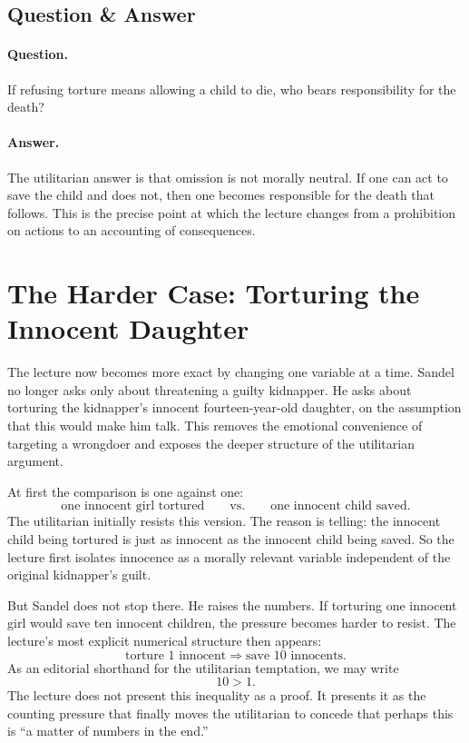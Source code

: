 \subsection{Question \& Answer}

\paragraph{Question.} If refusing torture means allowing a child to die, who bears responsibility for the death?

\paragraph{Answer.} The utilitarian answer is that omission is not morally neutral. If one can act to save the child and does not, then one becomes responsible for the death that follows. This is the precise point at which the lecture changes from a prohibition on actions to an accounting of consequences.

\section{The Harder Case: Torturing the Innocent Daughter}

The lecture now becomes more exact by changing one variable at a time. Sandel no longer asks only about threatening a guilty kidnapper. He asks about torturing the kidnapper's innocent fourteen-year-old daughter, on the assumption that this would make him talk. This removes the emotional convenience of targeting a wrongdoer and exposes the deeper structure of the utilitarian argument.

At first the comparison is one against one:
\begin{equation}
\text{one innocent girl tortured}
\qquad \text{vs.} \qquad
\text{one innocent child saved}.
\end{equation}
The utilitarian initially resists this version. The reason is telling: the innocent child being tortured is just as innocent as the innocent child being saved. So the lecture first isolates innocence as a morally relevant variable independent of the original kidnapper's guilt.

But Sandel does not stop there. He raises the numbers. If torturing one innocent girl would save ten innocent children, the pressure becomes harder to resist. The lecture's most explicit numerical structure then appears:
\begin{equation}
\text{torture }1\text{ innocent}
\Longrightarrow
\text{save }10\text{ innocents}.
\end{equation}
As an editorial shorthand for the utilitarian temptation, we may write
\begin{equation}
10 > 1.
\end{equation}
The lecture does not present this inequality as a proof. It presents it as the counting pressure that finally moves the utilitarian to concede that perhaps this is ``a matter of numbers in the end.''

